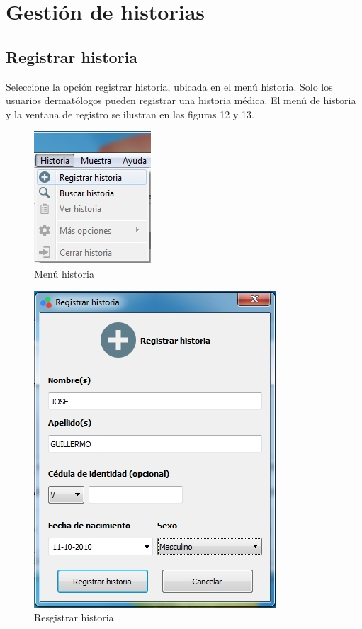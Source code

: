 \begin{figure}[H]
\begin{minipage}{.5\textwidth}
  \label{fig:test2}
\end{minipage}
\end{figure}

\newpage

\section{Gesti\'{o}n de historias}

	\subsection{Registrar historia}
	
	Seleccione la opci\'{o}n registrar historia, ubicada en el men\'{u} historia. Solo los usuarios dermat\'{o}logos pueden registrar una historia m\'{e}dica. El men\'{u} de historia y la ventana de registro se ilustran en las figuras 12 y 13.

\begin{figure}[H]
  \centering
  \includegraphics[width=.3\linewidth]{./img/menu-historia.jpg}
\caption{Men\'{u} historia}
\end{figure}

\begin{figure}[H]
  \centering
  \includegraphics[width=.4\linewidth]{./img/registrar-historia.jpg}
\caption{Resgistrar historia}
\end{figure}

